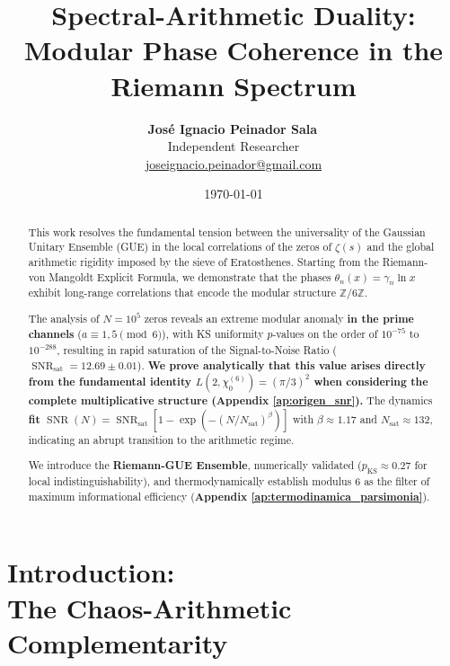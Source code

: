 \documentclass[12pt, a4paper]{article}
\title{\textbf{Spectral-Arithmetic Duality: \\
Modular Phase Coherence in the Riemann Spectrum}}
\author{
  \textbf{José Ignacio Peinador Sala}\,\orcidlink{0009-0008-1822-3452} \\
  Independent Researcher \\[2pt]
  \small\href{mailto:joseignacio.peinador@gmail.com}{joseignacio.peinador@gmail.com}
}
\date{\today}
\theoremstyle{plain}
\theoremstyle{definition}
\theoremstyle{remark}
\newcommand{\Z}{\mathbb{Z}}
\newcommand{\SNR}{\operatorname{SNR}}
\begin{document}
\maketitle

\begin{abstract}
This work resolves the fundamental tension between the universality of the Gaussian Unitary Ensemble (GUE) in the local correlations of the zeros of $\zeta(s)$ and the global arithmetic rigidity imposed by the sieve of Eratosthenes. Starting from the Riemann-von Mangoldt Explicit Formula, we demonstrate that the phases $\theta_n(x) = \gamma_n \ln x$ exhibit long-range correlations that encode the modular structure $\Z/6\Z$.

The analysis of $N=10^5$ zeros reveals an extreme modular anomaly \textbf{in the prime channels} ($a \equiv 1,5 \pmod{6}$), with KS uniformity $p$-values on the order of $10^{-75}$ to $10^{-288}$, resulting in rapid saturation of the Signal-to-Noise Ratio ($\SNR_{\text{sat}} = 12.69 \pm 0.01$). \textbf{We prove analytically that this value arises directly from the fundamental identity $L(2,\chi_0^{(6)}) = (\pi/3)^2$ when considering the complete multiplicative structure (Appendix \ref{ap:origen_snr}).} The dynamics \textbf{fit} $\SNR(N) = \SNR_{\text{sat}}[1 - \exp(-(N/N_{\text{sat}})^\beta)]$ with $\beta \approx 1.17$ and $N_{\text{sat}} \approx 132$, indicating an abrupt transition to the arithmetic regime.

We introduce the \textbf{Riemann-GUE Ensemble}, numerically validated ($p_{\text{KS}} \approx 0.27$ for local indistinguishability), and thermodynamically establish modulus 6 as the filter of maximum informational efficiency (\textbf{Appendix \ref{ap:termodinamica_parsimonia}}).
\end{abstract}

\section{Introduction:\texorpdfstring{\\}{} The Chaos-Arithmetic Complementarity}
\label{sec:introduccion}
\end{document}
